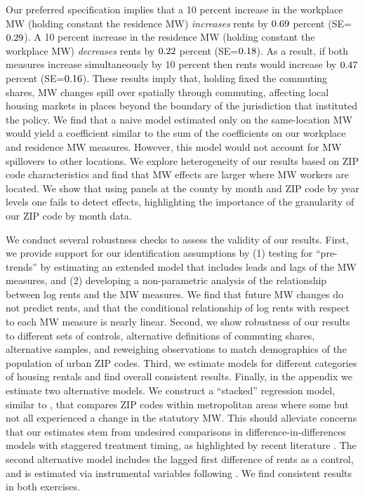 
Our preferred specification implies that 
a 10 percent increase in the workplace MW (holding constant the residence MW) 
\textit{increases} rents by $0.69$ percent 
(SE=$0.29$).
A 10 percent increase in the residence MW (holding constant the workplace MW) 
\textit{decreases} rents by $0.22$ percent 
(SE=$0.18$). 
As a result, if both measures increase simultaneously by 10 percent then 
rents would increase by $0.47$ percent 
(SE=$0.16$).
These results imply that, holding fixed the commuting shares, MW 
changes spill over spatially through commuting, affecting local housing markets 
in places beyond the boundary of the jurisdiction that instituted the policy.
We find that a naive model estimated only on the same-location MW would yield a 
coefficient similar to the sum of the coefficients on our workplace and 
residence MW measures.
However, this model would not account for MW spillovers to other locations.
We explore heterogeneity of our results based on ZIP code characteristics and
find that MW effects are larger where MW workers are located.
We show that using panels at the county by month and ZIP code by year levels 
one fails to detect effects, highlighting the importance of the granularity of 
our ZIP code by month data.


We conduct several robustness checks to assess the validity of our results.
First, we provide support for our identification assumptions by
(1) testing for ``pre-trends'' by estimating an extended model that includes 
leads and lags of the MW measures, and 
(2) developing a non-parametric analysis of the relationship between log rents
and the MW measures.
We find that future MW changes do not predict rents, and that the conditional
relationship of log rents with respect to each MW measure is nearly linear.
Second, we show robustness of our results to different sets of controls,
alternative definitions of commuting shares, alternative samples,
and reweighing observations to match demographics of the population of
urban ZIP codes.
Third, we estimate models for different categories of housing rentals and
find overall consistent results.
Finally, in the appendix we estimate two alternative models.
We construct a ``stacked'' regression model, similar to \textcite{CegnizEtAl2019},
that compares ZIP codes within metropolitan areas where some but not all 
experienced a change in the statutory MW.
This should alleviate concerns that our estimates stem from undesired 
comparisons in difference-in-differences models with staggered treatment timing, 
as highlighted by recent literature 
\parencite{deChaisemartinEtAl2022,RothEtAl2022}.
The second alternative model includes the lagged first difference of rents as 
a control, and is estimated via instrumental variables following 
\textcite{ArellanoBond1991}.
We find consistent results in both exercises.

